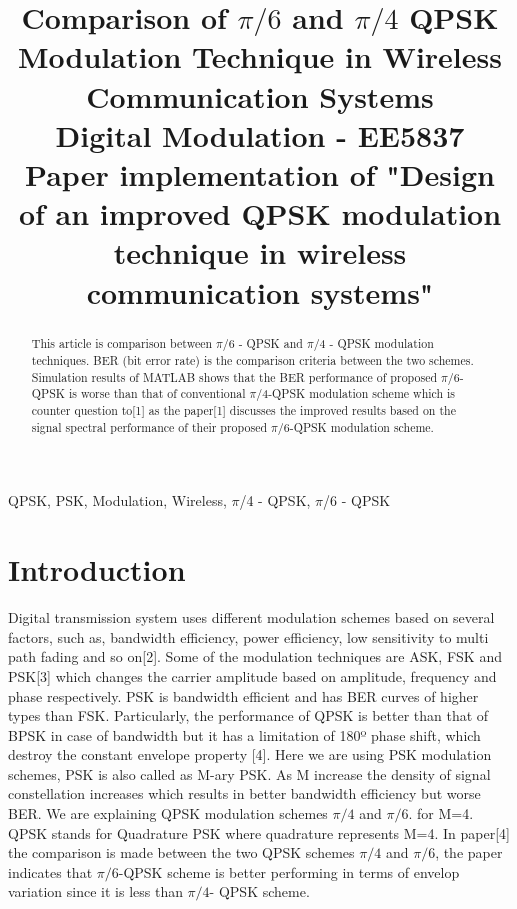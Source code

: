 \documentclass[conference]{IEEEtran}
\begin{document}
\title{Comparison of $\pi/6$ and $\pi/4$ QPSK Modulation Technique in Wireless Communication Systems\\
{\footnotesize  Digital Modulation - EE5837}\\
{\footnotesize Paper implementation of "Design of an improved QPSK modulation technique in wireless communication systems"}
}

\author{
}

\maketitle

\begin{abstract}
This article is comparison between $\pi$/6 - QPSK and $\pi$/4 -  QPSK modulation techniques. BER (bit error rate) is the comparison criteria between the two schemes. Simulation results of MATLAB shows that the BER performance of proposed $\pi$/6-QPSK is worse than that of conventional $\pi$/4-QPSK modulation scheme which is counter question to[1] as the paper[1] discusses the improved results based on the signal spectral performance of their proposed $\pi/6$-QPSK modulation scheme.

\end{abstract}

\begin{IEEEkeywords}
QPSK, PSK, Modulation, Wireless, $\pi$/4 - QPSK, $\pi$/6 - QPSK 
\end{IEEEkeywords}

\section{Introduction}
Digital transmission system  uses different modulation schemes based on several factors, such as, bandwidth efficiency, power efficiency, low sensitivity to multi path fading and so on[2]. Some of the modulation techniques are ASK, FSK and PSK[3] which changes the carrier amplitude based on amplitude, frequency and phase respectively. PSK is bandwidth efficient and has BER curves of higher types than FSK. Particularly, the performance
of QPSK is better than that of BPSK in case of bandwidth but
it has a limitation of 180º phase shift, which destroy the
constant envelope property [4]. Here we are using PSK modulation schemes, PSK is also called as M-ary PSK. As M increase the density of signal constellation increases which results in better bandwidth efficiency but worse BER. We are explaining QPSK modulation schemes $\pi/4$ and $\pi/6$. for M=4. QPSK stands for Quadrature PSK where quadrature represents M=4. In paper[4] the comparison is made between the two QPSK schemes $\pi/4$ and $\pi/6$, the paper indicates that $\pi/6$-QPSK scheme is better performing in terms of envelop variation since it is less than $\pi/4$- QPSK scheme. 
\end{document}
